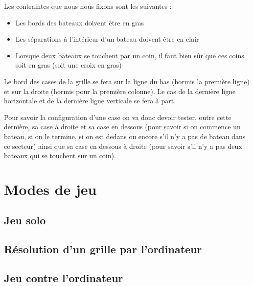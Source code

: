 Les contraintes que nous nous fixons sont les suivantes :
\begin{itemize}
\item Les bords des bateaux doivent être en gras
\item Les séparations à l'intérieur d'un bateau doivent être en clair
\item Lorsque deux bateaux se touchent par un coin, il faut bien sûr que ces coins soit en gras (soit une croix en gras)
\end{itemize}

Le bord des cases de la grille se fera sur la ligne du bas (hormis la première ligne) et sur la droite (hormis pour la première colonne). Le cas de la dernière ligne horizontale et de la dernière ligne verticale se fera à part.

Pour savoir la configuration d'une case on va donc devoir tester, outre cette dernière, sa case à droite et sa case en dessous (pour savoir si on commence un bateau, si on le termine, si on est dedans ou encore s'il n'y a pas de bateau dans ce secteur) ainsi que sa case en dessous à droite (pour savoir s'il n'y a pas deux bateaux qui se touchent sur un coin).


\section{Modes de jeu}
\subsection{Jeu solo}

\subsection{Résolution d'un grille par l'ordinateur}

\subsection{Jeu contre l'ordinateur}

